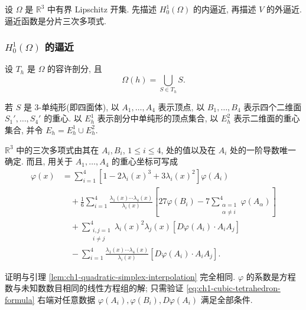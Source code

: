 设 $\Omega$ 是 $\mathbb R^3$ 中有界 Lipschitz 开集. 先描述
$H_0^1(\Omega)$ 的内逼近, 再描述 $V$ 的外逼近. 逼近函数是分片三次多项式.

\subsubsection{\texorpdfstring{$H_0^1(\Omega)$}{H01(Omega)} 的逼近}

设 $T_h$ 是 $\Omega$ 的容许剖分, 且
\begin{equation}
\Omega(h)=\bigcup_{S\in T_h}S.
\label{eq:ch1-degree-three-domain}
\end{equation}

若 $S$ 是 3-单纯形(即四面体), 以 $A_1,\ldots,A_4$ 表示顶点, 以 $B_1,\ldots,B_4$ 表示四个二维面 $S_1',\ldots,S_4'$ 的重心. 以 $E_h^1$ 表示剖分中单纯形的顶点集合, 以 $E_h^2$ 表示二维面的重心集合, 并令 $E_h=E_h^1\cup E_h^2$.

\begin{Lemma}
\label{lem:ch1-cubic-tetrahedron-interpolation}
$\mathbb R^3$ 中的三次多项式由其在 $A_i,B_i$, $1\leq i\leq4$, 处的值以及在 $A_i$ 处的一阶导数唯一确定. 而且, 用关于 $A_1,\ldots,A_4$ 的重心坐标可写成
\begin{equation}
\begin{aligned}
\varphi(x)
&=\sum_{i=1}^4[1-2\lambda_i(x)^3+3\lambda_i(x)^2]\varphi(A_i)\\
&\quad+\frac16\sum_{i=1}^4
\frac{\lambda_1(x)\cdots\lambda_4(x)}{\lambda_i(x)}
\left[27\varphi(B_i)-7\sum_{\substack{\alpha=1\\\alpha\neq i}}^4\varphi(A_\alpha)\right]\\
&\quad+\sum_{\substack{i,j=1\\i\neq j}}^4
\lambda_i(x)^2\lambda_j(x)[D\varphi(A_i)\cdot A_iA_j]\\
&\quad-\sum_{i=1}^4
\frac{\lambda_1(x)\cdots\lambda_4(x)}{\lambda_i(x)}
[D\varphi(A_i)\cdot A_iA_j].
\end{aligned}
\label{eq:ch1-cubic-tetrahedron-formula}
\end{equation}
\end{Lemma}

\begin{Proof}
证明与引理 \ref{lem:ch1-quadratic-simplex-interpolation} 完全相同. $\varphi$ 的系数是方程数与未知数数目相同的线性方程组的解; 只需验证
\eqref{eq:ch1-cubic-tetrahedron-formula} 右端对任意数据
$\varphi(A_i),\varphi(B_i),D\varphi(A_i)$ 满足全部条件.
\end{Proof}

